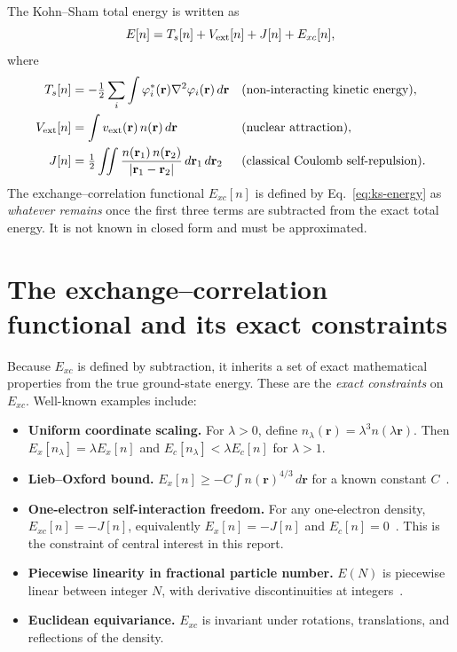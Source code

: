 \documentclass[11pt]{report}
\theoremstyle{definition}
\theoremstyle{remark}
\newcommand{\Exc}{E_{xc}}
\begin{document}
The Kohn--Sham total energy is written as
\begin{equation}
E[n] = T_s[n] + V_{\rm ext}[n] + J[n] + \Exc[n],
\label{eq:ks-energy}
\end{equation}
where
\begin{align}
T_s[n] &= -\tfrac12 \sum_i \int \varphi_i^*(\mathbf r) \nabla^2
          \varphi_i(\mathbf r)\, d\mathbf r
          && \text{(non-interacting kinetic energy)},\\
V_{\rm ext}[n] &= \int v_{\rm ext}(\mathbf r)\, n(\mathbf r)\, d\mathbf r
          && \text{(nuclear attraction)},\\
J[n] &= \tfrac12 \iint \frac{n(\mathbf r_1)\, n(\mathbf r_2)}
                          {|\mathbf r_1 - \mathbf r_2|}
        \, d\mathbf r_1 \, d\mathbf r_2
          && \text{(classical Coulomb self-repulsion)}.
\end{align}
The exchange--correlation functional $\Exc[n]$ is defined by
Eq.~\eqref{eq:ks-energy} as \emph{whatever remains} once the first three
terms are subtracted from the exact total energy. It is not known in closed
form and must be approximated.

\section{The exchange--correlation functional and its exact constraints}

Because $\Exc$ is defined by subtraction, it inherits a set of exact
mathematical properties from the true ground-state energy. These are the
\emph{exact constraints} on $\Exc$. Well-known examples include:

\begin{itemize}
  \item \textbf{Uniform coordinate scaling.}
        For $\lambda > 0$, define $n_\lambda(\mathbf r) = \lambda^3
        n(\lambda \mathbf r)$. Then
        $E_x[n_\lambda] = \lambda E_x[n]$ and
        $E_c[n_\lambda] < \lambda E_c[n]$ for $\lambda > 1$.
  \item \textbf{Lieb--Oxford bound.}
        $E_x[n] \ge -C \int n(\mathbf r)^{4/3}\, d\mathbf r$ for a known
        constant $C$~\cite{LO1981}.
  \item \textbf{One-electron self-interaction freedom.}
        For any one-electron density,
        $\Exc[n] = -J[n]$, equivalently $E_x[n] = -J[n]$ and $E_c[n] = 0$~\cite{PZ1981}.
        This is the constraint of central interest in this report.
  \item \textbf{Piecewise linearity in fractional particle number.}
        $E(N)$ is piecewise linear between integer $N$, with derivative
        discontinuities at integers~\cite{PPLB1982}.
  \item \textbf{Euclidean equivariance.}
        $\Exc$ is invariant under rotations, translations, and reflections
        of the density.
\end{itemize}
\end{document}
